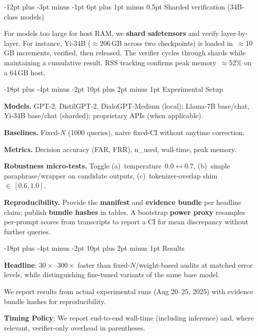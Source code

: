 \documentclass[11pt]{article}
\makeatletter
\renewcommand\section{\@startsection{section}{1}{\z@}%
  {-18pt plus -4pt minus -2pt}%
  {10pt plus 2pt minus 1pt}%
  {\normalfont\Large\bfseries}}
\renewcommand\subsection{\@startsection{subsection}{2}{\z@}%
  {-12pt plus -3pt minus -1pt}%
  {6pt plus 1pt minus 0.5pt}%
  {\normalfont\large\bfseries}}
\makeatother
\begin{document}
\subsection{Sharded verification (34B-class models)}

For models too large for host RAM, we \textbf{shard safetensors} and verify layer-by-layer. For instance, Yi-34B (${\approx}$206\,GB across two checkpoints) is loaded in~${\approx}$10\,GB increments, verified, then released. The verifier cycles through shards while maintaining a cumulative result. RSS tracking confirms peak memory~${\approx}$52\% on a 64\,GB host.

\section{Experimental Setup}

\textbf{Models.} GPT-2, DistilGPT-2, DialoGPT-Medium (local); Llama-7B base/chat, Yi-34B base/chat (sharded); proprietary APIs (when applicable).

\textbf{Baselines.} Fixed-$N$ (1000 queries), naive fixed-CI without anytime correction.

\textbf{Metrics.} Decision accuracy (FAR, FRR), n\_used, wall-time, peak memory.

\textbf{Robustness micro-tests.} Toggle (a)~temperature~$0.0 \leftrightarrow 0.7$, (b)~simple paraphrase/wrapper on candidate outputs, (c)~tokenizer-overlap shim~${\in}\,[0.6,1.0]$.

\textbf{Reproducibility.} Provide the \textbf{manifest} and \textbf{evidence bundle} per headline claim; publish \textbf{bundle hashes} in tables. A bootstrap \textbf{power proxy} resamples per-prompt scores from transcripts to report a CI for mean discrepancy without further queries.

\section{Results}
\label{sec:results}

\textbf{Headline}: $30{\times}$--$300{\times}$ faster than fixed-$N$/weight-based audits at matched error levels, while distinguishing fine-tuned variants of the same base model.

We report results from actual experimental runs (Aug 20--25, 2025) with evidence bundle hashes for reproducibility.

\textbf{Timing Policy}: We report end-to-end wall-time (including inference) and, where relevant, verifier-only overhead in parentheses.
\end{document}
